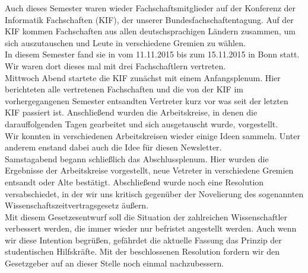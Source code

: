 Auch dieses Semester waren wieder Fachschaftsmitglieder auf der Konferenz der Informatik Fachschaften (KIF), der unserer Bundesfachschaftentagung. Auf der KIF kommen Fachschaften aus allen deutschsprachigen Ländern zusammen, um sich auszutauschen und Leute in verschiedene Gremien zu wählen.\\
In diesem Semester fand sie in vom 11.11.2015 bis zum 15.11.2015 in Bonn statt. Wir waren dort dieses mal mit drei Fachschaftlern vertreten.\\
Mittwoch Abend startete die KIF zunächst mit einem Anfangsplenum. Hier berichteten alle vertretenen Fachschaften und die von der KIF im vorhergegangenen Semester entsandten Vertreter kurz vor was seit der letzten KIF passiert ist. Anschließend wurden die Arbeitskreise, in denen die darauffolgenden Tagen gearbeitet und sich ausgetauscht wurde, vorgestellt.\\
Wir konnten in verschiedenen Arbeitskreisen wieder einige Ideen sammeln. Unter anderem enstand dabei auch die Idee für diesen Newsletter.\\
Samstagabend begann schließlich das Abschlussplenum. Hier wurden die Ergebnisse der Arbeitskreise vorgestellt, neue Vetreter in verschiedene Gremien entsandt oder Alte bestätigt. Abschließend wurde noch eine Resolution versabschiedet, in der wir uns kritisch gegenüber der Novelierung des sogenannten Wissenschaftszeitvertragsgesetz äußern.\\
Mit diesem Gesetzesentwurf soll die Situation der zahlreichen Wissenschaftler verbessert werden, die immer wieder nur befristet angestellt werden. Auch wenn wir diese Intention begrüßen, gefährdet die aktuelle Fassung das Prinzip der studentischen Hilfskräfte. Mit der beschlossenen Resolution fordern wir den Gesetzgeber auf an dieser Stelle noch einmal nachzubessern.



